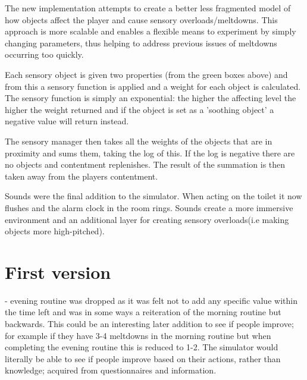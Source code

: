 \documentclass[11pt]{report}
\begin{document}
The new implementation attempts to create a better less fragmented model of how objects affect the player and cause sensory overloads/meltdowns. This approach is more scalable and enables a flexible means to experiment by simply changing parameters, thus helping to address previous issues of meltdowns occurring too quickly.

Each sensory object is given two properties (from the green boxes above) and from this a sensory function is applied and a weight for each object is calculated. The sensory function is simply an exponential: the higher the affecting level the higher the weight returned and if the object is set as a 'soothing object' a negative value will return instead. 

The sensory manager then takes all the weights of the objects that are in proximity and sums them, taking the log of this. If the log is negative there are no objects and contentment replenishes. The result of the summation is then taken away from the players contentment. 

Sounds were the final addition to the simulator. When acting on the toilet it now flushes and the alarm clock in the room rings. Sounds create a more immersive environment and an additional layer for creating sensory overloads(i.e making objects more high-pitched). 

\chapter{First version}
- evening routine was dropped as it was felt not to add any specific value within the time left and was in some ways a reiteration of the morning routine but backwards. This could be an interesting later addition to see if people improve; for example if they have 3-4 meltdowns in the morning routine but when completing the evening routine this is reduced to 1-2. The simulator would literally be able to see if people improve based on their actions, rather than knowledge; acquired from questionnaires and information. 
\end{document}
